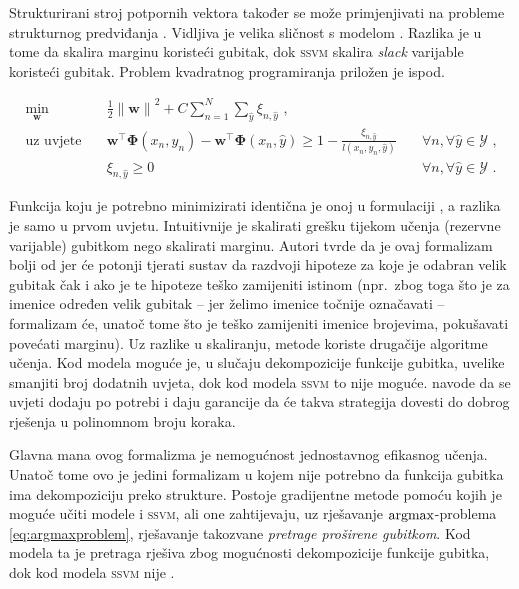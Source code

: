 Strukturirani stroj potpornih vektora  također se može primjenjivati na probleme strukturnog predviđanja
\citep{tsochantaridis2005large}. Vidljiva je velika sličnost s modelom \mmmm{}.
Razlika je u tome da \mmmm{} skalira marginu koristeći gubitak, dok
\textsc{ssvm} skalira \textit{slack} varijable koristeći gubitak. Problem
kvadratnog programiranja priložen je ispod.

\begin{equation}\label{eq:ssvm}
\begin{aligned}
  \min_{\mathbf{w}} & \quad \frac{1}{2} {\lVert\mathbf{w}\lVert}^2 + C \sum_{n=1}^{N}\sum_{\hat{y}} \xi_{n,\hat{y}} \text{ ,}              & \\
  \text{uz uvjete}  & \quad \mathbf{w}^\top \mathbf{\Phi}(x_n, y_n) - \mathbf{w}^\top \mathbf{\Phi}(x_n, \hat{y}) \ge 1 - \frac{\xi_{n,\hat{y}}}{l(x_n, y_n, \hat{y})} & \quad \forall n, \forall \hat{y} \in \mathcal{Y} \text{ ,}\\
                    & \quad \xi_{n,\hat{y}} \ge 0                                                                                          & \quad \forall n, \forall \hat{y} \in \mathcal{Y} \text{ .}
\end{aligned}
\end{equation}

\noindent
Funkcija koju je potrebno minimizirati identična je onoj u formulaciji \mmmm{},
a razlika je samo u prvom uvjetu. Intuitivnije je skalirati grešku tijekom
učenja (rezervne  varijable) gubitkom nego skalirati marginu. Autori
tvrde da je ovaj formalizam bolji od \mmmm{} jer će potonji tjerati sustav da
razdvoji hipoteze za koje je odabran velik gubitak čak i ako je te hipoteze
teško zamijeniti istinom (npr.~zbog toga što je za imenice određen velik gubitak --
jer želimo imenice točnije označavati -- formalizam \mmmm{} će, unatoč tome što
je teško zamijeniti imenice brojevima, pokušavati povećati marginu). Uz razlike
u skaliranju, metode koriste drugačije algoritme učenja. Kod modela \mmmm{}
moguće je, u slučaju dekompozicije funkcije gubitka, uvelike smanjiti broj
dodatnih uvjeta, dok kod modela \textsc{ssvm} to nije moguće.
\citet{tsochantaridis2005large} navode da se uvjeti dodaju po potrebi i daju
garancije da će takva strategija dovesti do dobrog rješenja u polinomnom broju
koraka.

Glavna mana ovog formalizma je nemogućnost jednostavnog efikasnog učenja. Unatoč
tome ovo je jedini formalizam u kojem nije potrebno da funkcija gubitka ima
dekompoziciju preko strukture. Postoje gradijentne metode pomoću kojih je moguće
učiti modele \mmmm{} i \textsc{ssvm}, ali one zahtijevaju, uz rješavanje
$\operatorname*{argmax}$-problema \ref{eq:argmaxproblem}, rješavanje takozvane \textit{pretrage
proširene gubitkom}. Kod modela \mmmm{} ta je pretraga rješiva zbog mogućnosti
dekompozicije funkcije gubitka, dok kod modela \textsc{ssvm} nije
\citep{ratliff2006maximum}.
